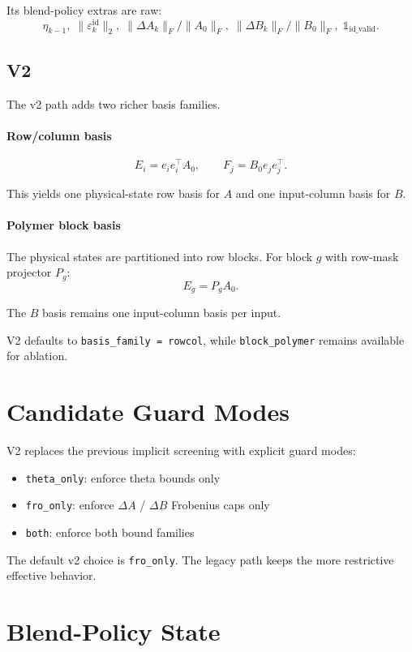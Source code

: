 \documentclass[11pt]{article}
\begin{document}
Its blend-policy extras are raw:
\[
\eta_{k-1},\;
\|\varepsilon_k^{\mathrm{id}}\|_2,\;
\|\Delta A_k\|_F / \|A_0\|_F,\;
\|\Delta B_k\|_F / \|B_0\|_F,\;
\mathbb{1}_{\mathrm{id\_valid}}.
\]

\subsection*{V2}

The v2 path adds two richer basis families.

\paragraph*{Row/column basis}
\[
E_i = e_i e_i^\top A_0, \qquad
F_j = B_0 e_j e_j^\top.
\]

This yields one physical-state row basis for $A$ and one input-column basis
for $B$.

\paragraph*{Polymer block basis}

The physical states are partitioned into row blocks. For block $g$ with
row-mask projector $P_g$:
\[
E_g = P_g A_0.
\]

The $B$ basis remains one input-column basis per input.

V2 defaults to \texttt{basis\_family = rowcol}, while
\texttt{block\_polymer} remains available for ablation.

\section*{Candidate Guard Modes}

V2 replaces the previous implicit screening with explicit guard modes:

\begin{itemize}
\item \texttt{theta\_only}: enforce theta bounds only
\item \texttt{fro\_only}: enforce $\Delta A$ / $\Delta B$ Frobenius caps only
\item \texttt{both}: enforce both bound families
\end{itemize}

The default v2 choice is \texttt{fro\_only}. The legacy path keeps the more
restrictive effective behavior.

\section*{Blend-Policy State}
\end{document}
